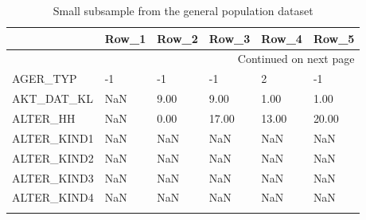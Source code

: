 \begin{longtable}{lp{1cm}p{1cm}p{1cm}p{1cm}p{1cm}}
\toprule
{} & Row\_1 & Row\_2 & Row\_3 & Row\_4 & Row\_5 \\
\midrule
\endhead
\midrule
\multicolumn{6}{r}{{Continued on next page}} \\
\midrule
\endfoot

\bottomrule
\endlastfoot
AGER\_TYP & -1 & -1 & -1 & 2 & -1 \\
AKT\_DAT\_KL & NaN & 9.00 & 9.00 & 1.00 & 1.00 \\
ALTER\_HH & NaN & 0.00 &  17.00 &  13.00 &  20.00 \\
ALTER\_KIND1 & NaN & NaN & NaN & NaN & NaN \\
ALTER\_KIND2 & NaN & NaN & NaN & NaN & NaN \\
ALTER\_KIND3 & NaN & NaN & NaN & NaN & NaN \\
ALTER\_KIND4 & NaN & NaN & NaN & NaN & NaN \\
\caption{Small subsample from the general population dataset}
\label{tab:AZDIAS_SHORT} \\
\end{longtable}